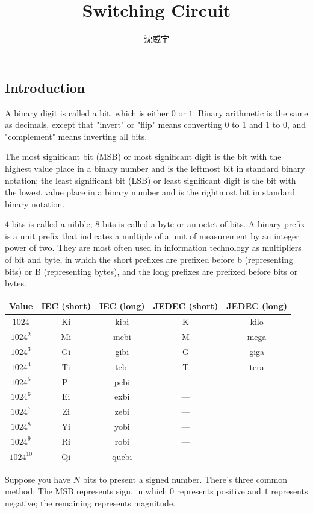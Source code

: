 \documentclass[a4paper,12pt]{report}
\begin{document}
\title{Switching Circuit}
\author{沈威宇}
\date{\temtoday}
\titletocdoc
{}
\subsection{Introduction}
A binary digit is called a bit, which is either $0$ or $1$. Binary arithmetic is the same as decimals, except that "invert" or "flip" means converting $0$ to $1$ and $1$ to $0$, and "complement" means inverting all bits.

The most significant bit (MSB) or most significant digit is the bit with the highest value place in a binary number and is the leftmost bit in standard binary notation; the least significant bit (LSB) or least significant digit is the bit with the lowest value place in a binary number and is the rightmost bit in standard binary notation.

$4$ bits is called a nibble; $8$ bits is called a byte or an octet of bits.
A binary prefix is a unit prefix that indicates a multiple of a unit of measurement by an integer power of two. They are most often used in information technology as multipliers of bit and byte, in which the short prefixes are prefixed before b (representing bits) or B (representing bytes), and the long prefixes are prefixed before bits or bytes.
\begin{longtable}[c]{|c|c|c|c|c|}
\hline
Value & IEC (short) & IEC (long) & JEDEC (short) & JEDEC (long)\\\hline
$1024$ & Ki & kibi & K & kilo\\\hline
$1024^2$ & Mi & mebi & M & mega\\\hline
$1024^3$ & Gi & gibi & G & giga\\\hline
$1024^4$ & Ti & tebi & T & tera\\\hline
$1024^5$ & Pi & pebi & —\\\hline
$1024^6$ & Ei & exbi & —\\\hline
$1024^7$ & Zi & zebi & —\\\hline
$1024^8$ & Yi & yobi & —\\\hline
$1024^9$ & Ri & robi & —\\\hline
$1024^10$ & Qi & quebi & —\\\hline
\end{longtable}\FB
{}
Suppose you have $N$ bits to present a signed number. There's three common method:
The MSB represents sign, in which $0$ represents positive and $1$ represents negative; the remaining represents magnitude. 
\end{document}
